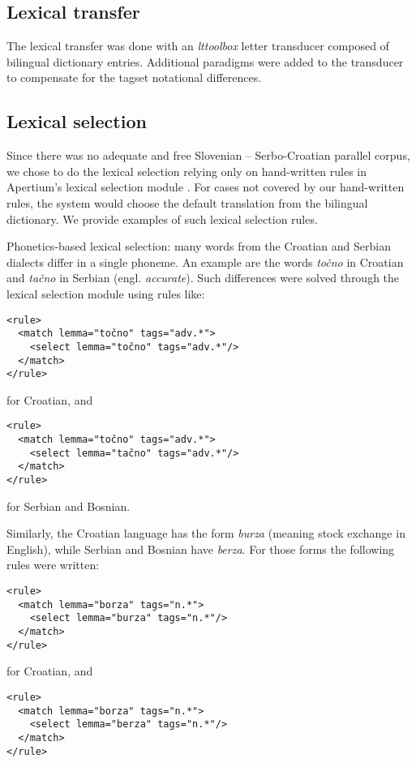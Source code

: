 \subsection{Lexical transfer}
The lexical transfer was done with an \emph{lttoolbox} letter
transducer composed of bilingual dictionary entries. Additional
paradigms were added to the transducer to compensate for the tagset
notational differences.


\subsection{Lexical selection}

Since there was no adequate and free Slovenian -- Serbo-Croatian parallel corpus, 
we chose to do the lexical selection relying only on hand-written rules in 
Apertium's lexical selection module \citep{tyers12a}.
For cases not covered by our hand-written rules, the system would choose the 
default translation from the bilingual dictionary.
We provide examples of such lexical selection rules.

Phonetics-based lexical selection: many words from the Croatian and Serbian dialects differ in a single phoneme.
An example are the words \emph{točno} in Croatian and \emph{tačno} in Serbian (engl. \emph{accurate}).
Such differences were solved through the lexical selection module using rules like:

{\small
\begin{Verbatim}
<rule>
  <match lemma="točno" tags="adv.*">
    <select lemma="točno" tags="adv.*"/>
  </match>
</rule>
\end{Verbatim}
}
for Croatian, and
{\small
\begin{Verbatim}
<rule>
  <match lemma="točno" tags="adv.*">
    <select lemma="tačno" tags="adv.*"/>
  </match>
</rule>
\end{Verbatim}
}
for Serbian and Bosnian.

Similarly, the Croatian language has the form \emph{burza} (meaning stock exchange in English), while Serbian and Bosnian have \emph{berza}. 
For those forms the following rules were written:

{\small
\begin{Verbatim}
<rule>
  <match lemma="borza" tags="n.*">
    <select lemma="burza" tags="n.*"/>
  </match>
</rule>
\end{Verbatim}
}
for Croatian, and 
{\small
\begin{Verbatim}
<rule>
  <match lemma="borza" tags="n.*">
    <select lemma="berza" tags="n.*"/>
  </match>
</rule>

\end{Verbatim}
}

